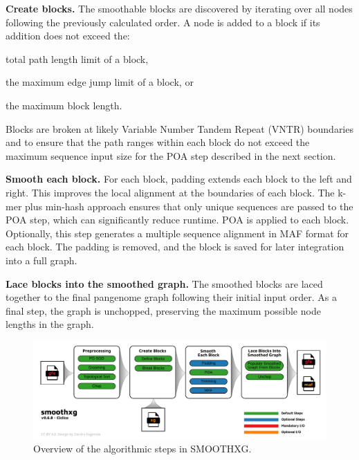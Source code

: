 \documentclass[pdflatex,mathphys]{jnl}%
\theoremstyle{thmstyleone}%
\theoremstyle{thmstyletwo}%
\theoremstyle{thmstylethree}%
\begin{document}
\begin{appendices}
\textbf{Create blocks.}
The smoothable blocks are discovered by iterating over all nodes following the previously calculated order. A node is added to a block if its addition does not exceed the:
\begin{inparaenum}
  \item total path length limit of a block,
  \item the maximum edge jump limit of a block, or
  \item the maximum block length.
\end{inparaenum}
Blocks are broken at likely Variable Number Tandem Repeat (VNTR) boundaries and to ensure that the path ranges within each block do not exceed the maximum sequence input size for the POA step described in the next section.

\textbf{Smooth each block.}
For each block, padding extends each block to the left and right. This improves the local alignment at the boundaries of each block.
The k-mer plus min-hash approach ensures that only unique sequences are passed to the POA step, which can significantly reduce runtime.
POA is applied to each block.
Optionally, this step generates a multiple sequence alignment in MAF format for each block. %
The padding is removed, and the block is saved for later integration into a full graph.

\textbf{Lace blocks into the smoothed graph.}
The smoothed blocks are laced together to the final pangenome graph following their initial input order. As a final step, the graph is unchopped, preserving the maximum possible node lengths in the graph.

\begin{figure}[htb!]{}
    \centering
	\includegraphics[width=\linewidth]{fig/smoothxg_workflow.pdf}
	\caption{Overview of the algorithmic steps in SMOOTHXG.}
	\label{fig:smoothxg}
\end{figure}


\end{appendices}
\end{document}
